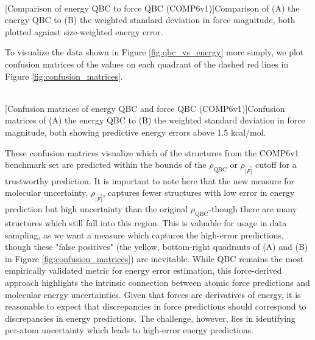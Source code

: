 \begin{flushleft}
\begin{multiFigure}
\centering
     \\
[Comparison of energy QBC to force QBC (COMP6v1)]{Comparison of (A) the energy QBC to (B) the weighted standard deviation in force magnitude, both plotted against size-weighted energy error.}
\label{fig:qbc_vs_energy}
\end{multiFigure}
\end{flushleft}

To visualize the data shown in Figure \ref{fig:qbc_vs_energy} more simply, we plot confusion matrices of the values on each quadrant of the dashed red lines in Figure \ref{fig:confusion_matrices}.

\begin{flushleft}
\begin{multiFigure}
\centering
     \\
[Confusion matrices of energy QBC and force QBC (COMP6v1)]{Confusion matrices of (A) the energy QBC to (B) the weighted standard deviation in force magnitude, both showing predictive energy errors above 1.5 kcal/mol.}
\label{fig:confusion_matrices}
\end{multiFigure}
\end{flushleft}

These confusion matrices visualize which of the structures from the COMP6v1 benchmark set are predicted within the bounds of the $\rho_\text{QBC}$ or $\rho_{\vec{|F|}}$ cutoff for a trustworthy prediction. 
It is important to note here that the new measure for molecular uncertainty, $\rho_{\vec{|F|}}$, captures fewer structures with low error in energy prediction but high uncertainty than the original $\rho_\text{QBC}$-though there are many structures which still fall into this region.
This is valuable for usage in data sampling, as we want a measure which captures the high-error predictions, though these "false positives" (the yellow, bottom-right quadrants of (A) and (B) in Figure \ref{fig:confusion_matrices}) are inevitable.
While QBC remains the most empirically validated metric for energy error estimation, this force-derived approach highlights the intrinsic connection between atomic force predictions and molecular energy uncertainties. 
Given that forces are derivatives of energy, it is reasonable to expect that discrepancies in force predictions should correspond to discrepancies in energy predictions. 
The challenge, however, lies in identifying per-atom uncertainty which leads to high-error energy predictions.

